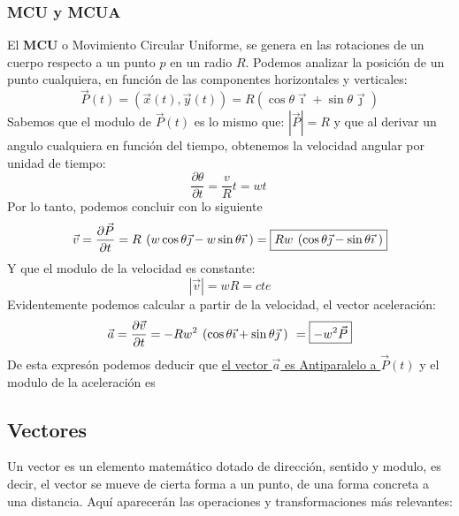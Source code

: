 \subsubsection{MCU y MCUA}
\begin{wrapfigure}{1}{6cm}
        \hspace{0.2cm}
        
        \par
\end{wrapfigure}
El \textbf{MCU} o Movimiento Circular Uniforme, se genera en las rotaciones de un cuerpo respecto a un punto \(p\) en un radio \(R\).
Podemos analizar la posición de un punto cualquiera, en función de las componentes horizontales y verticales:
\[
        \boxed{\vec{P}(t)=(\vec{x}(t),\vec{y}(t))=R(\cos{\theta}\vec{\imath} + \sin{\theta}\vec{\jmath})}
\]
Sabemos que el modulo de \(\vec{P}(t)\) es lo mismo que: \(\left | \vec{P} \right | = R\) y que al derivar un angulo cualquiera en función del tiempo, obtenemos la velocidad angular por unidad de tiempo: \[
        \frac{\partial \theta}{\partial t} = \frac{v}{R}t = wt\
\]
Por lo tanto, podemos concluir con lo siguiente
\[
        \vec{v} =\frac{\partial \vec{P}}{\partial t} =R \hspace{1.35mm} (w\cos{\theta}\vec{\jmath} - w\sin{\theta}\vec{\imath}\hspace{1mm})  = \boxed{Rw \hspace{1.35mm} (\cos{\theta}\vec{\jmath} - \sin{\theta}\vec{\imath}\hspace{1mm})}
\]
Y que el modulo de la velocidad es constante:
\[
        \left | \vec{v} \right | = wR = cte
\]
Evidentemente podemos calcular a partir de la velocidad, el vector aceleración:
\[
        \vec{a} =\frac{\partial \vec{v}}{\partial t} = -Rw^2 \hspace{1.35mm}(\cos{\theta}\vec{\imath} + \sin{\theta}\vec{\jmath}\hspace{1mm}) \hspace{1.35mm}= \boxed{-w^{2}\vec{P}}
\]
De esta expresón podemos deducir que \underline{el vector \(\vec{a}\) es Antiparalelo a \(\vec{P}(t)\)} y el modulo de la aceleración es 
\subsection{Vectores}
Un vector es un elemento matemático dotado de dirección, sentido y modulo, es decir, el vector se mueve de cierta forma a un punto, de una forma concreta a una distancia.
Aquí aparecerán las operaciones y transformaciones más relevantes:


